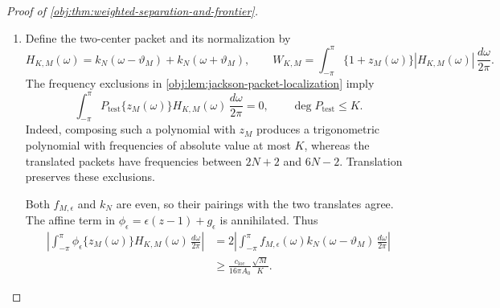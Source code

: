 \begin{proof}[Proof of \cref{obj:thm:weighted-separation-and-frontier}]
\begin{enumerate}
To control the other kink, put
\[
\beta_M=\pi-\vartheta_M.
\]
Since \(M\ge2\), one has \(\vartheta_M\in[\pi/2,\pi)\), and hence
\[
\|2\vartheta_M\|_{\mathbb T}=2\beta_M,
\qquad
\cos\beta_M=1-\frac2M.
\]
The inequality \(1-\cos\beta_M\le\beta_M^2/2\) gives
\[
\beta_M\ge\frac2{\sqrt M},
\qquad
\|2\vartheta_M\|_{\mathbb T}\ge\frac4{\sqrt M}.
\]
Applying the localized bound for \(G_N\) gives, with
\[
C_{\mathrm{opp}}=\frac{C_{\mathrm{loc}}}{16},
\]
\[
|G_N(2\vartheta_M)|
\le
\frac{C_{\mathrm{loc}}}
     {N\{1+N\|2\vartheta_M\|_{\mathbb T}\}^2}
\le\frac{C_{\mathrm{opp}}M}{N^3}.
\]

Choose a universal integer \(A_0\) satisfying
\[
A_0>
\max\left\{
1,\frac{2C_{\mathrm{opp}}}{c_{\mathrm{loc}}},
\frac{32\pi C_{\mathrm{sm}}}{c_{\mathrm{loc}}}
\right\},
\qquad
N=A_0K.
\]
Then
\[
2C_{\mathrm{opp}}\le c_{\mathrm{loc}}A_0^2,
\qquad
32\pi C_{\mathrm{sm}}\le c_{\mathrm{loc}}A_0,
\]
so \(M\le K^2\) implies
\[
|G_N(2\vartheta_M)|\le\frac{c_{\mathrm{loc}}}{2N},
\qquad
|G_N(0)+G_N(2\vartheta_M)|
\ge\frac{c_{\mathrm{loc}}}{2N}.
\]
Also,
\[
\sqrt{M-1}\ge\frac{\sqrt M}{2},
\qquad
\frac{C_{\mathrm{sm}}M}{N^2}
\le\frac{c_{\mathrm{loc}}\sqrt M}{32\pi N}.
\]
The integration-by-parts identity consequently proves
\[
\left|
\int_{-\pi}^{\pi}
f_{M,\epsilon}(\omega)k_N(\omega-\vartheta_M)\,
\frac{d\omega}{2\pi}
\right|
\ge
\frac{c_{\mathrm{loc}}\sqrt M}{32\pi N}.
\]

\item
Define the two-center packet and its normalization by
\[
H_{K,M}(\omega)
=k_N(\omega-\vartheta_M)+k_N(\omega+\vartheta_M),
\qquad
W_{K,M}
=\int_{-\pi}^{\pi}
\{1+z_M(\omega)\}|H_{K,M}(\omega)|\,\frac{d\omega}{2\pi}.
\]
The frequency exclusions in
\cref{obj:lem:jackson-packet-localization} imply
\[
\int_{-\pi}^{\pi}
P_{\mathrm{test}}\{z_M(\omega)\}H_{K,M}(\omega)\,
\frac{d\omega}{2\pi}=0,
\qquad
\deg P_{\mathrm{test}}\le K.
\]
Indeed, composing such a polynomial with \(z_M\) produces a trigonometric polynomial with frequencies of absolute value at most \(K\), whereas the translated packets have frequencies between \(2N+2\) and \(6N-2\). Translation preserves these exclusions.

Both \(f_{M,\epsilon}\) and \(k_N\) are even, so their pairings with the two translates agree. The affine term in
\(\phi_\epsilon=\epsilon(z-1)+g_\epsilon\) is annihilated. Thus
\[
\begin{aligned}
\left|
\int_{-\pi}^{\pi}
\phi_\epsilon\{z_M(\omega)\}H_{K,M}(\omega)\,
\frac{d\omega}{2\pi}
\right|
&=
2\left|
\int_{-\pi}^{\pi}
f_{M,\epsilon}(\omega)k_N(\omega-\vartheta_M)\,
\frac{d\omega}{2\pi}
\right|\\
&\ge
\frac{c_{\mathrm{loc}}}{16\pi A_0}\frac{\sqrt M}{K}.
\end{aligned}
\]


\end{enumerate}
\end{proof}
